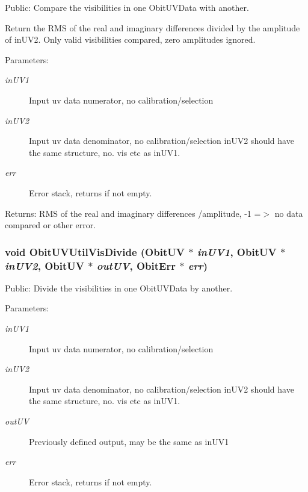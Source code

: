 Public: Compare the visibilities in one Obit\-UVData with another. 

Return the RMS of the real and imaginary differences divided by the amplitude of in\-UV2. Only valid visibilities compared, zero amplitudes ignored. \begin{Desc}
\item[Parameters:]
\begin{description}
\item[{\em in\-UV1}]Input uv data numerator, no calibration/selection \item[{\em in\-UV2}]Input uv data denominator, no calibration/selection in\-UV2 should have the same structure, no. vis etc as in\-UV1. \item[{\em err}]Error stack, returns if not empty. \end{description}
\end{Desc}
\begin{Desc}
\item[Returns:]RMS of the real and imaginary differences /amplitude, -1 =$>$ no data compared or other error. \end{Desc}
\subsubsection{\setlength{\rightskip}{0pt plus 5cm}void Obit\-UVUtil\-Vis\-Divide ({\bf Obit\-UV} $\ast$ {\em in\-UV1}, {\bf Obit\-UV} $\ast$ {\em in\-UV2}, {\bf Obit\-UV} $\ast$ {\em out\-UV}, {\bf Obit\-Err} $\ast$ {\em err})}\label{ObitUVUtil_8h_a2}


Public: Divide the visibilities in one Obit\-UVData by another. 

\begin{Desc}
\item[Parameters:]
\begin{description}
\item[{\em in\-UV1}]Input uv data numerator, no calibration/selection \item[{\em in\-UV2}]Input uv data denominator, no calibration/selection in\-UV2 should have the same structure, no. vis etc as in\-UV1. \item[{\em out\-UV}]Previously defined output, may be the same as in\-UV1 \item[{\em err}]Error stack, returns if not empty. \end{description}
\end{Desc}
